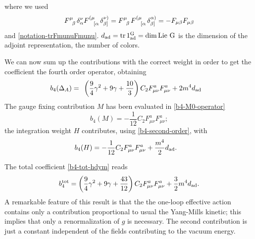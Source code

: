 where we used
\begin{equation}
F\indices{^{\mu}_\beta }\delta^{\nu }_{ \alpha }
F\indices{^{(\mu}_{ [ \alpha } }\delta^{\nu )}_{\beta ]  }
	= 
F\indices{^{\mu}_\beta }
F\indices{^{(\mu}_{ [ \alpha } }\delta^{ \alpha )}_{\beta ]  }
	=
- F_{ \mu \beta } F_{\mu \beta}
\end{equation}
and \eqref{notation-trFmunuFmunu}. \(d_{ \text{ad} } = \operatorname{tr} 1_{\text{ad}}^{{ \text{G} }} = \dim \text{Lie}\ { \text{G} }\) is the dimension of the adjoint representation, \ie the number of colors.

We can now sum up the contributions with the correct weight in order to get the coefficient the fourth order operator, obtaining
\begin{align}\label{b4-operator-hdym}
b_4(\Delta_{A})
 =\phantom{.} &		
 	 \left( \frac{9}{4} \gamma^2 + 9 \gamma + \frac{10}{3} \right) C_2 F^a_{\mu\nu}F^a_{\mu\nu} 
 	+ 2 m^4 d_{ \text{ad} }
\end{align}
The gauge fixing contribution $M$ has been evaluated in \eqref{b4-M0-operator}
\begin{equation}
b_4 ({ M } ) = - \frac{1}{12} C_2 F^a_{\mu\nu}F^a_{\mu\nu}    ;
\end{equation} 
the integration weight $H$ contributes, using \eqref{b4-second-order}, with
\begin{align}\label{b4-H-HD-operator}
b_4 (H) & = - \frac{1}{12} C_2 F^a_{\mu\nu}F^a_{\mu\nu}    + \frac{m^4}{2} d_{ \text{ad} }.
\end{align}



The total coefficient \eqref{b4-tot-hdym} reads
\begin{equation}\label{b4-tot-hd-gauge}
b_4^{ \text{tot} }  =  \left( \frac{9}{4} \gamma^2 + 9 \gamma + \frac{43}{12} \right) C_2 F^a_{\mu\nu}F^a_{\mu\nu} + \frac{3}{2} m^4 d_{ \text{ad} }.
\end{equation}
A remarkable feature of this result is that the the one-loop effective action contains only a contribution proportional to usual the Yang-Mills  kinetic; this implies that only a renormalization of $g$ is necessary. The second contribution is just a constant independent of the fields contributing to the vacuum energy.


